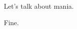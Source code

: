 \begin{paracol}{2}
  \begin{leftcolumn}

\null
\vfill
\begin{ally}
Let's talk about mania.
\end{ally}
Fine.
\vfill
\newpage

\end{leftcolumn}
\end{paracol}
